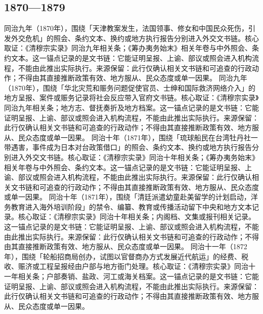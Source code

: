 \subsection{1870—1879}
同治九年（1870年），围绕「天津教案发生，法国领事、修女和中国民众死伤，引发外交危机」的照会、条约文本、换约或地方执行报告分别进入外交文书链。核心取证：《清穆宗实录》同治九年相关条；《筹办夷务始末》相关年卷与中外照会、条约文本。这一锚点记录的是文书链：它能证明呈报、上谕、部议或照会进入机构流程，不能由此推出实际执行。来源保留：此行仅确认相关文书链和可追查的行政动作；不得由其直接推断政策有效、地方服从、民众态度或单一因果。
同治九年（1870年），围绕「华北灾荒和赈务问题促使官员、士绅和国际救济网络介入」的地方呈报、案件或赈务记录将社会反应带入官府文书链。核心取证：《清穆宗实录》同治九年相关条；地方志、督抚奏折及地方档案。这一锚点记录的是文书链：它能证明呈报、上谕、部议或照会进入机构流程，不能由此推出实际执行。来源保留：此行仅确认相关文书链和可追查的行政动作；不得由其直接推断政策有效、地方服从、民众态度或单一因果。
同治十年（1871年），围绕「琉球船民在台湾牡丹社一带遇害，事件成为日本对台政策借口」的照会、条约文本、换约或地方执行报告分别进入外交文书链。核心取证：《清穆宗实录》同治十年相关条；《筹办夷务始末》相关年卷与中外照会、条约文本。这一锚点记录的是文书链：它能证明呈报、上谕、部议或照会进入机构流程，不能由此推出实际执行。来源保留：此行仅确认相关文书链和可追查的行政动作；不得由其直接推断政策有效、地方服从、民众态度或单一因果。
同治十年（1871年），围绕「清廷派遣幼童赴美留学的计划启动，洋务教育进入海外培训阶段」的禁令、编纂、教育或传播活动留下中央和地方文本记录。核心取证：《清穆宗实录》同治十年相关条；内阁档、文集或报刊相关记录。这一锚点记录的是文书链：它能证明呈报、上谕、部议或照会进入机构流程，不能由此推出实际执行。来源保留：此行仅确认相关文书链和可追查的行政动作；不得由其直接推断政策有效、地方服从、民众态度或单一因果。
同治十一年（1872年），围绕「轮船招商局创办，试图以官督商办方式发展近代航运」的经费、税收、赈济或工程呈报经由户部与地方衙门处理。核心取证：《清穆宗实录》同治十一年相关条；户部奏销、盐政、河工或海关档案。这一锚点记录的是文书链：它能证明呈报、上谕、部议或照会进入机构流程，不能由此推出实际执行。来源保留：此行仅确认相关文书链和可追查的行政动作；不得由其直接推断政策有效、地方服从、民众态度或单一因果。
